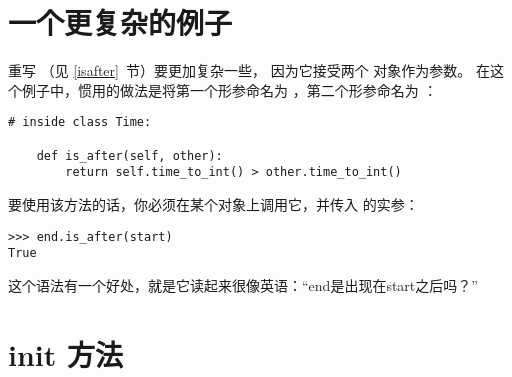 \section{一个更复杂的例子}


重写  （见 \ref{isafter}~节）要更加复杂一些，
因为它接受两个  对象作为参数。
在这个例子中，惯用的做法是将第一个形参命名为 ，第二个形参命名为 ：

\begin{lstlisting}
# inside class Time:

    def is_after(self, other):
        return self.time_to_int() > other.time_to_int()
\end{lstlisting}

%

要使用该方法的话，你必须在某个对象上调用它，并传入  的实参：

\begin{lstlisting}
>>> end.is_after(start)
True
\end{lstlisting}

%

这个语法有一个好处，就是它读起来很像英语：``end是出现在start之后吗？''

\section{init 方法}
  


